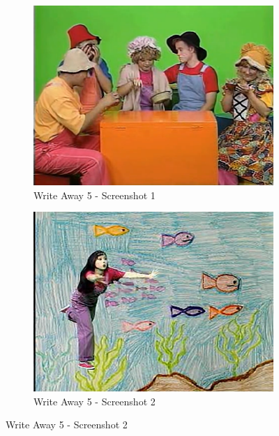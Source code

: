 \begin{figure}[H]
    \centering
    \begin{subfigure}{0.45\textwidth}
        \centering
        \includegraphics[width=\linewidth]{Games/WriteAway/Images/WriteAway5Screenshot1.png}
        \caption{Write Away 5 - Screenshot 1}
    \end{subfigure}
    \begin{subfigure}{0.45\textwidth}
        \centering
        \includegraphics[width=\linewidth]{Games/WriteAway/Images/WriteAway5Screenshot2.png}
        \caption{Write Away 5 - Screenshot 2}
    \end{subfigure}


\end{figure}
